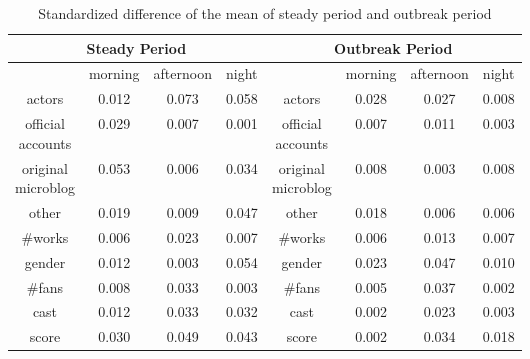 \begin{table*}[!htbp]
\centering
\caption{Standardized difference of the mean of steady period and outbreak period}
\begin{tabular}{|c|c|c|p{}|c|c|c|p{}|} \hline
\multicolumn{4}{|c}{Steady Period}& \multicolumn{4}{|c|}{Outbreak Period}\\ \hline
&morning&afternoon&\hfil night & &morning&afternoon&\hfil night\\ \hline
actors&0.012&0.073&\hfil 0.058&actors&0.028&0.027&\hfil 0.008\\ \hline
\tabincell{c}{official\\accounts}&0.029&0.007&\hfil 0.001&\tabincell{c}{official\\accounts}&0.007&0.011&\hfil 0.003 \\ \hline
\tabincell{c}{original\\microblog}&0.053&0.006&\hfil 0.034&\tabincell{c}{original\\microblog}&0.008&0.003&\hfil 0.008\\ \hline
other&0.019&0.009&\hfil 0.047&other&0.018&0.006&\hfil 0.006\\ \hline
 \#works&0.006&0.023&\hfil 0.007&\#works&0.006&0.013&\hfil 0.007\\ \hline
gender&0.012&0.003&\hfil 0.054&gender&0.023&0.047&\hfil 0.010\\ \hline
\#fans&0.008&0.033&\hfil 0.003&\#fans&0.005&0.037&\hfil 0.002\\ \hline
cast&0.012&0.033&\hfil 0.032&cast&0.002&0.023&\hfil 0.003\\ \hline
score&0.030&0.049&\hfil 0.043&score&0.002&0.034&\hfil0.018\\ \hline
\end{tabular}
\end{table*}












